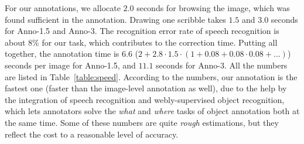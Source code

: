 \documentclass[runningheads]{llncs}
\makeatletter
\newcommand*{\eg}{e.g.\@\xspace}
\makeatother
\begin{document}
For our annotations, we allocate $2.0$ seconds for browsing the image, which was found sufficient in the annotation. Drawing one scribble takes $1.5$ and $3.0$ seconds for Anno-1.5 and
Anno-3. The recognition error rate of speech recognition is about
$8\%$ for our task, which contributes to the correction time. Putting
all together, the annotation time is $6.6$ ($2+2.8\cdot 1.5\cdot (1+0.08+0.08\cdot 0.08 + 
...)$) seconds per image for Anno-1.5, and $11.1$ seconds for
Anno-3.  All the
numbers are listed in Table~\ref{table:speed}. According to the
numbers, our annotation is the fastest one (faster than the
image-level annotation as well), due to the help by the integration of speech
recognition and webly-supervised object recognition, which lets annotators solve the \emph{what} and \emph{where} tasks of object annotation both at the same time. Some of these numbers are quite \emph{rough} estimations, but
they reflect the cost to a reasonable level of accuracy.



\end{document}
